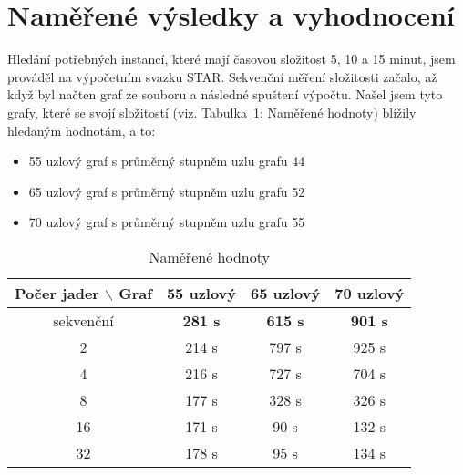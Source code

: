 \documentclass[11pt]{article}
\begin{document}
\section{Naměřené výsledky a vyhodnocení}



Hledání potřebných instancí, které mají časovou složitost 5, 10 a 15 minut, jsem prováděl na výpočetním svazku STAR. Sekvenční měření složitosti začalo, až když byl načten graf ze souboru a následné spuštení výpočtu. Našel jsem tyto grafy, které se svojí složitostí (viz. Tabulka~\ref{tab:namereneHodnoty}: Naměřené hodnoty) blížily hledaným hodnotám, a to:

\begin{itemize}
	\item 55 uzlový graf s  průměrný stupněm uzlu grafu 44
	\item 65 uzlový graf s  průměrný stupněm uzlu grafu 52 
	\item 70 uzlový graf s  průměrný stupněm uzlu grafu 55
\end{itemize}

\begin{table}[h]
	\caption{Naměřené hodnoty}
	\label{tab:namereneHodnoty}
	\centering
	\begin{tabular}{| c || c | c | c |}
		\hline
		\textbf{Počer jader $\backslash$ Graf} & \textbf{55 uzlový} & \textbf{65 uzlový} & \textbf{70 uzlový} \\
		\hline \hline
		sekvenční & \textbf{281 s} & \textbf{615 s} & \textbf{901 s}  \\
		\hline
		2 & 214 s & 797 s & 925 s \\
		\hline
		4 & 216 s & 727 s & 704 s  \\
		\hline
		8 & 177 s & 328 s & 326 s \\
		\hline
		16 & 171 s & 90 s & 132 s  \\
		\hline
		32 & 178 s & 95 s & 134 s  \\
		\hline
	\end{tabular}
\end{table}

\end{document}
